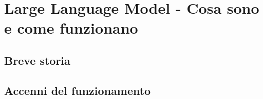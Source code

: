 \chapter{Large Language Model - Cosa sono e come funzionano}

\section{Breve storia}

\section{Accenni del funzionamento}

